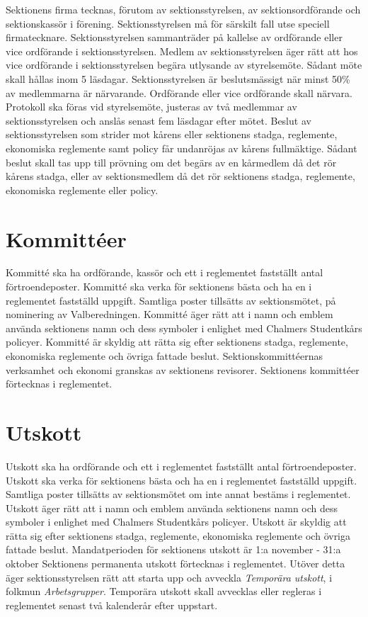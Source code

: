 \documentclass[a4paper]{dtek}
\begin{document}
\para[Firmateckning] Sektionens firma tecknas, förutom av sektionsstyrelsen, av sektionsordförande och sektionskassör i förening.
\stycke Sektionsstyrelsen må för särskilt fall utse speciell firmatecknare.
\para[Styrelsemöte] Sektionsstyrelsen sammanträder på kallelse av ordförande eller vice ordförande i sektionsstyrelsen.
\para Medlem av sektionsstyrelsen äger rätt att hos vice ordförande i sektionsstyrelsen begära utlysande av styrelsemöte.
\stycke Sådant möte skall hållas inom 5 läsdagar.
\para Sektionsstyrelsen är beslutsmässigt när minst 50\% av medlemmarna är närvarande. Ordförande eller vice ordförande skall närvara.
\para Protokoll ska föras vid styrelsemöte, justeras av två medlemmar av sektionsstyrelsen och anslås senast fem läsdagar efter mötet.
\para[Överklagande] Beslut av sektionsstyrelsen som strider mot kårens eller sektionens stadga, reglemente, ekonomiska reglemente samt policy får undanröjas av kårens fullmäktige.
\stycke Sådant beslut skall tas upp till prövning om det begärs av en kårmedlem då det rör kårens stadga, eller av sektionsmedlem då det rör sektionens stadga, reglemente, ekonomiska reglemente eller policy.

\section{Kommittéer}
\para[Definition] Kommitté ska ha ordförande, kassör och ett i reglementet fastställt antal förtroendeposter.
\para Kommitté ska verka för sektionens bästa och ha en i reglementet fastställd uppgift.
\para Samtliga poster tillsätts av sektionsmötet, på nominering av Valberedningen.
\para Kommitté äger rätt att i namn och emblem använda sektionens namn och dess symboler i enlighet med Chalmers Studentkårs policyer.
\para Kommitté är skyldig att rätta sig efter sektionens stadga, reglemente, ekonomiska reglemente och övriga fattade beslut.
\para Sektionskommittéernas verksamhet och ekonomi granskas av sektionens revisorer.
\para Sektionens kommittéer förtecknas i reglementet.

\section{Utskott}
\para Utskott ska ha ordförande och ett i reglementet fastställt antal förtroendeposter.
\para Utskott ska verka för sektionens bästa och ha en i reglementet fastställd uppgift.
\para Samtliga poster tillsätts av sektionsmötet om inte annat bestäms i reglementet. 
\para Utskott äger rätt att i namn och emblem använda sektionens namn och dess symboler i enlighet med Chalmers Studentkårs policyer.
\para Utskott är skyldig att rätta sig efter sektionens stadga, reglemente, ekonomiska reglemente och övriga fattade beslut.
\para Mandatperioden för sektionens utskott är 1:a november - 31:a oktober
\para Sektionens permanenta utskott förtecknas i reglementet.
 Utöver detta äger sektionsstyrelsen rätt att starta upp och avveckla \textit{Temporära utskott}, i folkmun \textit{Arbetsgrupper}.
\para Temporära utskott skall avvecklas eller regleras i reglementet senast två kalenderår efter uppstart.
\end{document}
